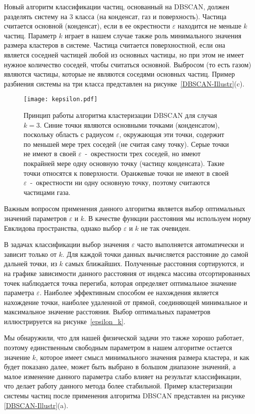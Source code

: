 Новый алгоритм классификации частиц, основанный на DBSCAN, должен разделять систему на 3 класса (на конденсат, газ и поверхность).
Частица считается основной (конденсат), если в ее окрестности $\varepsilon$ находится не меньше $k$ частиц.
Параметр $k$ играет в нашем случае также роль минимального значения размера кластеров в системе.
Частица считается поверхностной, если она является соседней частицей любой из основных частицы, но при этом не имеет нужное количество соседей, чтобы считаться основной.
Выбросом (то есть газом) являются частицы, которые не являются соседями основных частиц. Пример разбиения системы на три класса представлен на рисунке~\ref{DBSCAN-Illustr}(c).

\begin{figure}[!t]
    \centering
    \texttt{[image: kepsilon.pdf]}
    \caption{Принцип работы алгоритма кластеризации DBSCAN для случая $k = 3$. Синие точки являются основными точками (конденсатом), поскольку область с радиусом $\varepsilon$, окружающая эти точки, содержит по меньшей мере трех соседей (не считая саму точку).
    Серые точки не имеют в своей $\varepsilon$~-~окрестности трех соседей, но имеют покрайней мере одну основную точку (частицу конденсата).
    Такие точки относятся к поверхности.
    Оранжевые точки не имеют в своей $\varepsilon$~-~окрестности ни одну основную точку, поэтому считаются частицами газа.}
    \label{kepsilon}
\end{figure}

Важным вопросом применения данного алгоритма является выбор оптимальных значений параметров $\varepsilon$ и $k$.
В качестве функции расстояния мы используем норму Евклидова пространства, однако выбор $\varepsilon$ и $k$ не так очевиден.

В задачах классификации выбор значения $\varepsilon$ часто выполняется автоматически и зависит только от $k$.
Для каждой точки данных вычисляется расстояние до самой дальней точки, из $k$ самых ближайших.
Полученные расстояния сортируются, и на графике зависимости данного расстояния от индекса массива отсортированных точек наблюдается точка перегиба, которая определяет оптимальное значение параметра $\varepsilon$.
Наиболее эффективным способом ее нахождения является нахождение точки, наиболее удаленной от прямой, соединяющей минимальное и максимальное значение расстояния.
Выбор оптимальных параметров иллюстрируется на рисунке~\ref{epsilon_k}.

Мы обнаружили, что для нашей физической задачи это также хорошо работает, поэтому единственным свободным параметром в нашем алгоритме остается значение $k$, которое имеет смысл минимального значения размера кластера, и как будет показано далее, может быть выбрано в большом диапазоне значений, а малое изменение данного параметра слабо влияет на результат классификации, что делает работу данного метода более стабильной.
Пример кластеризации системы частиц после применения алгоритма DBSCAN представлен на рисунке \ref{DBSCAN-Illustr}(a).

